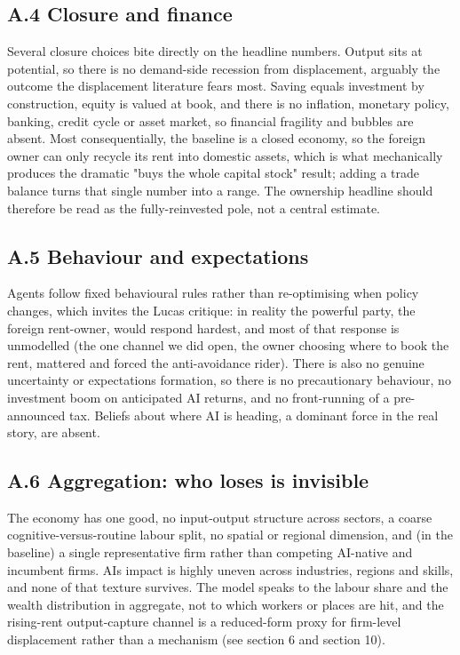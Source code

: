 \documentclass[12pt]{article}
\begin{document}
\hypertarget{a.4-closure-and-finance}{%
\subsection{A.4 Closure and finance}\label{a.4-closure-and-finance}}

Several closure choices bite directly on the headline numbers. Output
sits at potential, so there is no demand-side recession from
displacement, arguably the outcome the displacement literature fears
most. Saving equals investment by construction, equity is valued at
book, and there is no inflation, monetary policy, banking, credit cycle
or asset market, so financial fragility and bubbles are absent. Most
consequentially, the baseline is a closed economy, so the foreign owner
can only recycle its rent into domestic assets, which is what
mechanically produces the dramatic "buys the whole capital stock"
result; adding a trade balance turns that single number into a range.
The ownership headline should therefore be read as the fully-reinvested
pole, not a central estimate.

\hypertarget{a.5-behaviour-and-expectations}{%
\subsection{A.5 Behaviour and
expectations}\label{a.5-behaviour-and-expectations}}

Agents follow fixed behavioural rules rather than re-optimising when
policy changes, which invites the Lucas critique: in reality the
powerful party, the foreign rent-owner, would respond hardest, and most
of that response is unmodelled (the one channel we did open, the owner
choosing where to book the rent, mattered and forced the anti-avoidance
rider). There is also no genuine uncertainty or expectations formation,
so there is no precautionary behaviour, no investment boom on
anticipated AI returns, and no front-running of a pre-announced tax.
Beliefs about where AI is heading, a dominant force in the real story,
are absent.

\hypertarget{a.6-aggregation-who-loses-is-invisible}{%
\subsection{A.6 Aggregation: who loses is
invisible}\label{a.6-aggregation-who-loses-is-invisible}}

The economy has one good, no input-output structure across sectors, a
coarse cognitive-versus-routine labour split, no spatial or regional
dimension, and (in the baseline) a single representative firm rather
than competing AI-native and incumbent firms. AI\textquotesingle s
impact is highly uneven across industries, regions and skills, and none
of that texture survives. The model speaks to the labour share and the
wealth distribution in aggregate, not to which workers or places are
hit, and the rising-rent output-capture channel is a reduced-form proxy
for firm-level displacement rather than a mechanism (see section 6 and
section 10).
\end{document}
